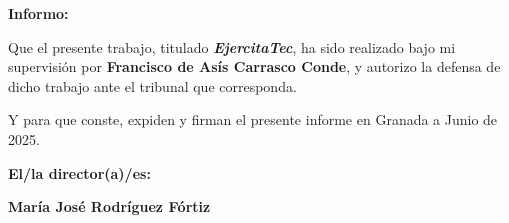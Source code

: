 \vspace{0.5cm}

\textbf{Informo:}

\vspace{0.5cm}

Que el presente trabajo, titulado \textit{\textbf{EjercitaTec}},
ha sido realizado bajo mi supervisión por \textbf{Francisco de Asís Carrasco Conde}, y autorizo la defensa de dicho trabajo ante el tribunal
que corresponda.

\vspace{0.5cm}

Y para que conste, expiden y firman el presente informe en Granada a Junio de 2025.

\vspace{1cm}

\textbf{El/la director(a)/es: }

\vspace{2cm}

\noindent \textbf{María José Rodríguez Fórtiz}
